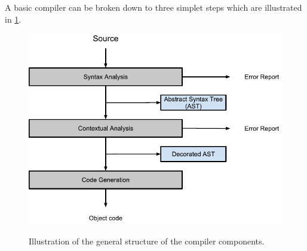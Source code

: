 A basic compiler can be broken down to three simplet steps which are illustrated in \ref{fig:compiler}.

\begin{figure}[H]
\begin{center}
\includegraphics[scale=0.7]{Images/compiler_drawing.png}
\label{fig:compiler}
\caption{Illustration of the general structure of the compiler components.}
\end{center}
\end{figure}